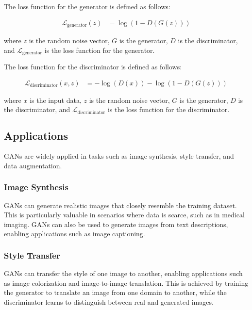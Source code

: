 \documentclass{article}
\begin{document}
			The loss function for the generator is defined as follows:

			\begin{align}
				\mathcal{L}_{\text{generator}}(z) &= \log(1 - D(G(z)))
			\end{align}

			where \(z\) is the random noise vector, \(G\) is the generator, \(D\) is the discriminator, and \(\mathcal{L}_{\text{generator}}\) is the loss function for the generator.

			The loss function for the discriminator is defined as follows:

			\begin{align}
				\mathcal{L}_{\text{discriminator}}(x, z) &= -\log(D(x)) - \log(1 - D(G(z)))
			\end{align}

			where \(x\) is the input data, \(z\) is the random noise vector, \(G\) is the generator, \(D\) is the discriminator, and \(\mathcal{L}_{\text{discriminator}}\) is the loss function for the discriminator.

		\subsection{Applications}

			GANs are widely applied in tasks such as image synthesis, style transfer, and data augmentation.

			\subsubsection{Image Synthesis}

				GANs can generate realistic images that closely resemble the training dataset. This is particularly valuable in scenarios where data is scarce, such as in medical imaging. GANs can also be used to generate images from text descriptions, enabling applications such as image captioning.

			\subsubsection{Style Transfer}

				GANs can transfer the style of one image to another, enabling applications such as image colorization and image-to-image translation. This is achieved by training the generator to translate an image from one domain to another, while the discriminator learns to distinguish between real and generated images.
\end{document}
